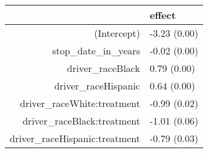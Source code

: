 \begin{table}[ht]
\centering
\begin{tabular}{rl}
  \hline
 & effect \\ 
  \hline
(Intercept) & -3.23 (0.00) \\ 
  stop\_date\_in\_years & -0.02 (0.00) \\ 
  driver\_raceBlack & 0.79 (0.00) \\ 
  driver\_raceHispanic & 0.64 (0.00) \\ 
  driver\_raceWhite:treatment & -0.99 (0.02) \\ 
  driver\_raceBlack:treatment & -1.01 (0.06) \\ 
  driver\_raceHispanic:treatment & -0.79 (0.03) \\ 
   \hline
\end{tabular}
\end{table}
